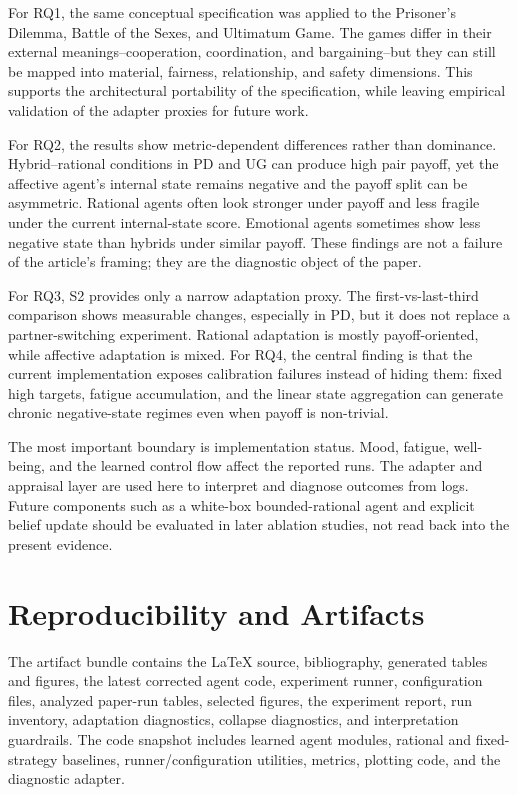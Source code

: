 \documentclass[runningheads]{llncs}
\begin{document}
For RQ1, the same conceptual specification was applied to the Prisoner's Dilemma, Battle of the Sexes, and Ultimatum Game. The games differ in their external meanings--cooperation, coordination, and bargaining--but they can still be mapped into material, fairness, relationship, and safety dimensions. This supports the architectural portability of the specification, while leaving empirical validation of the adapter proxies for future work.

For RQ2, the results show metric-dependent differences rather than dominance. Hybrid--rational conditions in PD and UG can produce high pair payoff, yet the affective agent's internal state remains negative and the payoff split can be asymmetric. Rational agents often look stronger under payoff and less fragile under the current internal-state score. Emotional agents sometimes show less negative state than hybrids under similar payoff. These findings are not a failure of the article's framing; they are the diagnostic object of the paper.

For RQ3, S2 provides only a narrow adaptation proxy. The first-vs-last-third comparison shows measurable changes, especially in PD, but it does not replace a partner-switching experiment. Rational adaptation is mostly payoff-oriented, while affective adaptation is mixed. For RQ4, the central finding is that the current implementation exposes calibration failures instead of hiding them: fixed high targets, fatigue accumulation, and the linear state aggregation can generate chronic negative-state regimes even when payoff is non-trivial.

The most important boundary is implementation status. Mood, fatigue, well-being, and the learned control flow affect the reported runs. The adapter and appraisal layer are used here to interpret and diagnose outcomes from logs. Future components such as a white-box bounded-rational agent and explicit belief update should be evaluated in later ablation studies, not read back into the present evidence.

\section{Reproducibility and Artifacts}

The artifact bundle contains the LaTeX source, bibliography, generated tables and figures, the latest corrected agent code, experiment runner, configuration files, analyzed paper-run tables, selected figures, the experiment report, run inventory, adaptation diagnostics, collapse diagnostics, and interpretation guardrails. The code snapshot includes learned agent modules, rational and fixed-strategy baselines, runner/configuration utilities, metrics, plotting code, and the diagnostic adapter.
\end{document}
